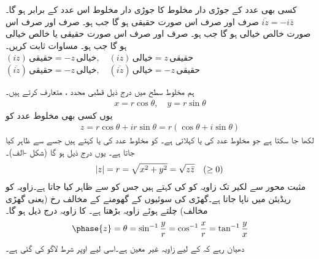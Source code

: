 \quad
کسی بھی  عدد کے جوڑی دار مخلوط کا جوڑی دار مخلوط اس عدد کے برابر ہو گا۔
\quad
$\overline{iz}=-i\bar{z}$
\quad
{} صرف اور صرف اس صورت حقیقی ہو گا جب  ہو۔
\quad
{} صرف اور صرف اس صورت خالص خیالی ہو گا جب  ہو۔
\quad
{} صرف اور صرف اس صورت حقیقی یا خالص خیالی ہو گا جب  ہو۔
\quad
مساوات  ثابت کریں۔
\quad
$(iz)\,\text{حقیقی}=-z\,\text{خیالی}, \quad (iz)\,\text{خیالی}=z\,\text{حقیقی}$
\quad
$(\overline{iz})\,\text{حقیقی}=-z\,\text{خیالی}, \quad (\overline{iz})\,\text{خیالی}=-z\,\text{حقیقی}$

ہم مخلوط سطح میں درج ذیل قطبی محدد ،  متعارف کرتے ہیں۔
\begin{align}
x=r\cos\theta,\quad y=r\sin\theta
\end{align}
یوں کسی بھی مخلوط عدد  کو
\begin{align}
z=r\cos\theta+ir\sin\theta=r(\cos\theta+i\sin\theta)
\end{align} 
لکھا جا سکتا ہے جو مخلوط عدد کی  یا  کہلاتی ہے۔ کو مخلوط عدد  کی  یا  کہتے ہیں جسے  سے ظاہر  کیا جاتا ہے۔ یوں درج ذیل ہو گا (شکل -الف)۔
\begin{align}
\abs{z}=r=\sqrt{x^2+y^2}=\sqrt{z\bar{z}}\quad (\ge 0)
\end{align}
مثبت محور  سے لکیر  تک زاویہ کو  کی  کہتے ہیں جس کو  سے ظاہر کیا جاتا ہے۔زاویہ کو ریڈیئن میں ناپا جاتا ہے۔گھڑی کی سوئیوں کے گھومنے کے مخالف    رخ (یعنی گھڑی مخالف)  چلتے ہوئے زاویہ بڑھتا ہے۔ کا زاویہ درج ذیل ہو گا۔
\begin{align}  
\phase{z}=\theta=\sin^{-1}\frac{y}{r}=\cos^{-1}\frac{x}{r}=\tan^{-1}\frac{y}{x}
\end{align}
دھیان رہے کہ  کے لیے زاویہ  غیر معین ہے۔اسی لیے اوپر شرط  لاگو کی گئی ہے۔

